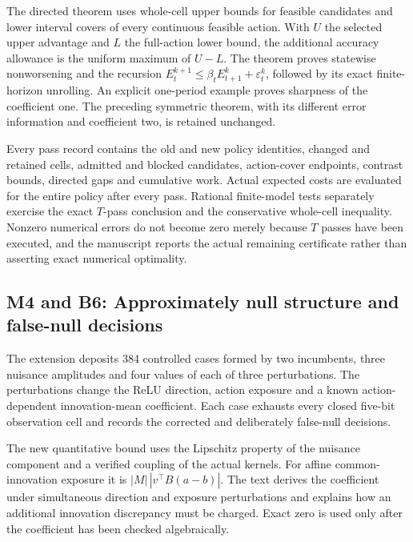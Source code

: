 \documentclass[ecta,nameyear,draft]{econsocart}
\begin{document}
The directed theorem uses whole-cell upper bounds for feasible
candidates and lower interval covers of every continuous feasible
action. With \(U\) the selected upper advantage and \(L\) the
full-action lower bound, the additional accuracy allowance is the
uniform maximum of \(U-L\). The theorem proves statewise nonworsening
and the recursion \(E_t^{k+1}\leq\beta_t E_{t+1}^k+\varepsilon_t^k\),
followed by its exact finite-horizon unrolling. An explicit one-period
example proves sharpness of the coefficient one. The preceding symmetric
theorem, with its different error information and coefficient two, is
retained unchanged.

Every pass record contains the old and new policy identities, changed
and retained cells, admitted and blocked candidates, action-cover
endpoints, contrast bounds, directed gaps and cumulative work. Actual
expected costs are evaluated for the entire policy after every pass.
Rational finite-model tests separately exercise the exact \(T\)-pass
conclusion and the conservative whole-cell inequality. Nonzero numerical
errors do not become zero merely because \(T\) passes have been
executed, and the manuscript reports the actual remaining certificate
rather than asserting exact numerical optimality.

\hypertarget{m4-and-b6-approximately-null-structure-and-false-null-decisions}{%
\subsection{M4 and B6: Approximately null structure and false-null
decisions}\label{m4-and-b6-approximately-null-structure-and-false-null-decisions}}

The extension deposits 384 controlled cases formed by two incumbents,
three nuisance amplitudes and four values of each of three
perturbations. The perturbations change the ReLU direction, action
exposure and a known action-dependent innovation-mean coefficient. Each
case exhausts every closed five-bit observation cell and records the
corrected and deliberately false-null decisions.

The new quantitative bound uses the Lipschitz property of the nuisance
component and a verified coupling of the actual kernels. For affine
common-innovation exposure it is \(|M|\,|v^\top B(a-b)|\). The text
derives the coefficient under simultaneous direction and exposure
perturbations and explains how an additional innovation discrepancy must
be charged. Exact zero is used only after the coefficient has been
checked algebraically.
\end{document}
